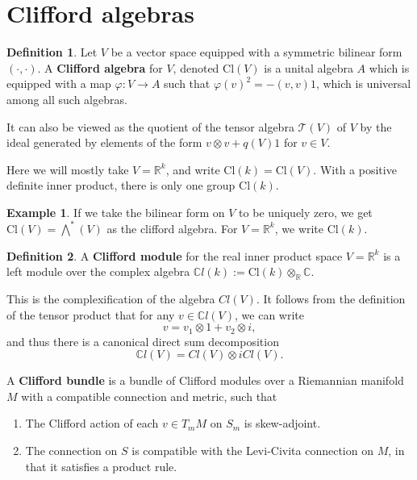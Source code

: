 \documentclass[11pt, reqno]{article}
\theoremstyle{plain}
\theoremstyle{definition}
\newtheorem*{definition}{Definition}
\newtheorem*{example}{Example}
\theoremstyle{remark}
\renewcommand{\phi}{\varphi}
\newcommand{\RR}{\mathbb{R}}
\begin{document}
\section{Clifford algebras}

\begin{definition}
    Let $V$ be a vector space equipped with a symmetric bilinear form $(\cdot, \cdot)$. A 
    \textbf{Clifford algebra} for $V$, denoted $\text{Cl}(V)$ is a unital algebra $A$ which is equipped with a map 
    $\phi:V \to A$ such that $\phi(v)^2 = -(v,v)1$, which is universal among all such algebras. 

    It can also be viewed as the quotient of the tensor algebra $\mathcal{T}(V)$ of $V$ by the ideal 
    generated by elements of the form $v \otimes v +q(V)1$ for $v \in V$. 
\end{definition}

Here we will mostly take $V = \RR^k$, and write $\text{Cl}(k) = \text{Cl}(V)$. With a positive definite inner
product, there is only one group $\text{Cl}(k)$.

\begin{example}
    If we take the bilinear form on $V$ to be uniquely zero, we get $\text{Cl}(V) = \bigwedge^*(V)$ as 
    the clifford algebra. For $V = \RR^k$, we write $\text{Cl}(k)$.
\end{example}

\begin{definition}
    A \textbf{Clifford module} for the real inner product space $V = \RR^k$ is a left module over the complex algebra 
    $\mathbb{C}l(k) := \text{Cl}(k)\otimes_{\RR}\mathbb{C}$.

    This is the complexification of the algebra $Cl(V)$. It follows from the definition of the tensor product
    that for any $v \in \mathbb{C}l(V)$, we can write
    \[
        v = v_1 \otimes 1 + v_2 \otimes i,
    \]
    and thus there is a canonical direct sum decomposition
    \[
        \mathbb{C}l(V) = Cl(V) \otimes iCl(V).
    \]

    A \textbf{Clifford bundle} is a bundle of Clifford modules over a Riemannian manifold $M$ with 
    a compatible connection and metric, such that 
    \begin{enumerate}
        \item[(i)] The Clifford action of each $v \in T_m M$ on $S_m$ is skew-adjoint.
        \item[(ii)] The connection on $S$ is compatible with the Levi-Civita connection on $M$,
        in that it satisfies a product rule. 
    \end{enumerate}
\end{definition}
\end{document}
